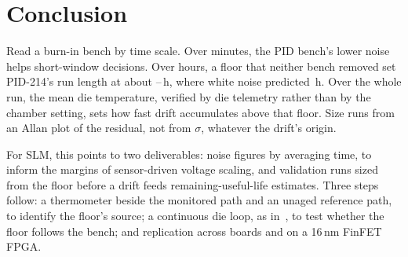 \documentclass[10pt,twocolumn]{article}
\begin{document}
\section{Conclusion}

Read a burn-in bench by time scale. Over minutes, the PID bench's lower noise helps short-window decisions. Over hours, a floor that neither bench removed set PID-214's run length at about \vDetFairLo--\vDetFairHi\,h, where white noise predicted \vTminBound\,h. Over the whole run, the mean die temperature, verified by die telemetry rather than by the chamber setting, sets how fast drift accumulates above that floor. Size runs from an Allan plot of the residual, not from $\sigma$, whatever the drift's origin.

For SLM, this points to two deliverables: noise figures by averaging time, to inform the margins of sensor-driven voltage scaling, and validation runs sized from the floor before a drift feeds remaining-useful-life estimates. Three steps follow: a thermometer beside the monitored path and an unaged reference path, to identify the floor's source; a continuous die loop, as in~\cite{sobas,xilinx}, to test whether the floor follows the bench; and replication across boards and on a 16\,nm FinFET FPGA.
\end{document}
